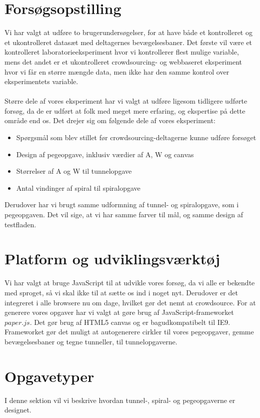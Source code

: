 \section*{Forsøgsopstilling}
Vi har valgt at udføre to brugerundersøgelser, for at have både et kontrolleret og et ukontrolleret datasæt med deltagernes bevægelsesbaner.
Det første vil være et kontrolleret laboratorieeksperiment hvor vi kontrollerer flest mulige variable, mens det andet er et ukontrolleret crowdsourcing- og webbaseret eksperiment hvor vi får en større mængde data, men ikke har den samme kontrol over eksperimentets variable.\\\\
Større dele af vores eksperiment har vi valgt at udføre ligesom tidligere udførte forsøg, da de er udført at folk med meget mere erfaring, og ekspertise på dette område end os.
Det drejer sig om følgende dele af vores eksperiment:
\begin{itemize}
\item Spørgsmål som blev stillet før crowdsourcing-deltagerne kunne udføre forsøget \cite{goldberg2015}
\item Design af pegeopgave, inklusiv værdier af A, W og canvas \cite{goldberg2015}
\item Størrelser af A og W til tunnelopgave \cite{accot1997}
\item Antal vindinger af spiral til spiralopgave \cite{accot1997}
\end{itemize}
Derudover har vi brugt samme udformning af tunnel- og spiralopgave, som i pegeopgaven. Det vil sige, at vi har samme farver til mål, og samme design af testfladen.

\section*{Platform og udviklingsværktøj}
Vi har valgt at bruge JavaScript til at udvikle vores forsøg, da vi alle er bekendte med sproget, så vi skal ikke til at sætte os ind i noget nyt. Derudover er det integreret i alle browsere nu om dage, hvilket gør det nemt at crowdsource. For at generere vores opgaver har vi valgt at gøre brug af JavaScript-frameworket $paper.js$. Det gør brug af HTML5 canvas og er bagudkompatibelt til IE9. Frameworket gør det muligt at autogenerere cirkler til vores pegeopgaver, gemme bevægelsesbaner og tegne tunneller, til tunnelopgaverne.

\section*{Opgavetyper}
I denne sektion vil vi beskrive hvordan tunnel-, spiral- og pegeopgaverne er designet.

